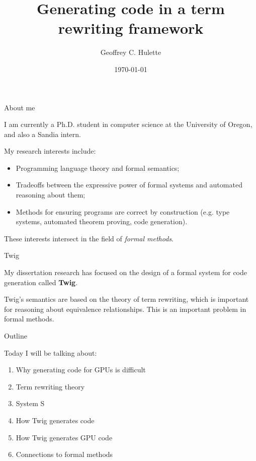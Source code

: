 \documentclass{beamer}
\title{Generating code in a term rewriting framework}
\author{Geoffrey C. Hulette}
\date{\today}
\begin{document}
\begin{frame}[plain]
  \titlepage
\end{frame}


\begin{frame}{About me}

I am currently a Ph.D. student in computer science at the University of
Oregon, and also a Sandia intern. 

My research interests include:

\begin{itemize}

\item Programming language theory and formal semantics;

\item Tradeoffs between the expressive power of formal systems and automated
reasoning about them;

\item Methods for ensuring programs are correct by construction (e.g. type
systems, automated theorem proving, code generation).

\end{itemize}

These interests intersect in the field of \emph{formal methods}.

\end{frame}


\begin{frame}{Twig}

My dissertation research has focused on the design of a formal system for code
generation called \textbf{Twig}.

Twig's semantics are based on the theory of term rewriting, which is important
for reasoning about equivalence relationships. This is an important problem in
formal methods.

\end{frame}


\begin{frame}{Outline}

Today I will be talking about:

\begin{enumerate}
  \item Why generating code for GPUs is difficult
  \item Term rewriting theory
  \item System S
  \item How Twig generates code
  \item How Twig generates GPU code
  \item Connections to formal methods
\end{enumerate}

\end{frame}
\end{document}
